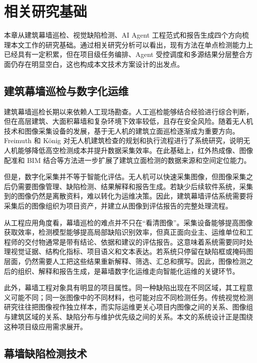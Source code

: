\chapter{相关研究基础}
\label{chap:related-work}

本章从建筑幕墙巡检、视觉缺陷检测、AI Agent 工程范式和报告生成四个方向梳理本文工作的研究基础。通过相关研究分析可以看出，现有方法在单点检测能力上已经具有一定积累，但在项目级任务编排、Agent 受控调度和多源结果分层整合方面仍存在明显空白，这也构成本文技术方案设计的出发点。

\section{建筑幕墙巡检与数字化运维}
\label{sec:related-facade-inspection}

建筑幕墙巡检长期以来依赖人工现场勘查。人工巡检能够结合经验进行综合判断，但在高层建筑、大面积幕墙和复杂环境下效率较低，且存在安全风险。随着无人机技术和图像采集设备的发展，基于无人机的建筑立面巡检逐渐成为重要方向。Freimuth 和 K{\"o}nig 对无人机建筑检查的规划和执行流程进行了系统研究，说明无人机能够降低高空检测成本并提升数据采集效率\cite{freimuth2018uav}。在此基础上，红外热成像、图像配准和 BIM 结合等方法进一步扩展了建筑立面检测的数据来源和空间定位能力\cite{li2024facade,zhang2023uavbim}。

但是，数字化采集并不等于智能化评估。无人机可以快速采集图像，但图像采集之后仍需要图像管理、缺陷检测、结果解释和报告生成。若缺少后续软件系统，采集到的图像仍然是离散资料，难以转化为运维决策。因此，建筑幕墙评估系统需要将采集后的图像组织为项目资产，并建立从图像到评估报告的完整处理流程。

从工程应用角度看，幕墙巡检的难点并不只在“看清图像”。采集设备能够提高图像获取效率，检测模型能够提高局部缺陷识别效率，但真正面向业主、运维单位和工程师的交付物通常是带有结论、依据和建议的评估报告。这意味着系统需要同时处理视觉证据、结构化指标、项目语义和文本表达。若系统只停留在缺陷框或掩码图层面，仍然需要人工把这些结果重新解释、筛选、汇总和撰写。因此，图像检测之后的组织、解释和报告生成，是幕墙数字化运维走向智能化运维的关键环节。

此外，幕墙工程对象具有明显的项目属性。同一种缺陷出现在不同区域，其工程意义可能不同；同一张图像中的不同材料，也可能对应不同检测任务。传统视觉检测研究往往把图像视作独立样本，而实际运维更关心项目内图像之间的关系、图像组与建筑区域的关系、缺陷分布与维护优先级之间的关系。本文的系统设计正是围绕这种项目级应用需求展开。

\section{幕墙缺陷检测技术}
\label{sec:related-defect-detection}

